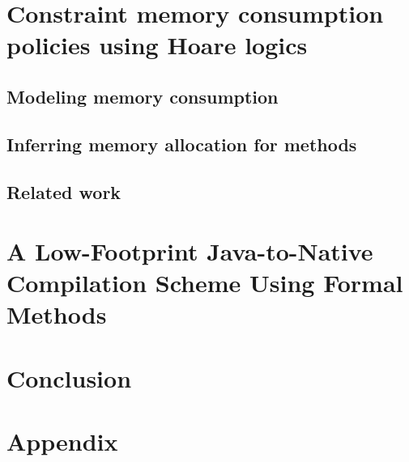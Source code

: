 \documentclass[book,10pt]{book}
\begin{document}
 
\chapter{Constraint memory consumption policies using Hoare logics}\label{applications:memory}
  
  \lstset{numbers=none}

  \section{Modeling memory consumption}\label{sec:verif}
    
  
  
  
  \section{Inferring memory allocation for methods}\label{sec:infer}
  \label{sec:infer}
  \section{Related work}\label{sec:rel}
  

\chapter{A Low-Footprint Java-to-Native Compilation Scheme Using Formal Methods}\label{applications:optimComp}
  \lstset{frameround=tttt}
  
  
  
  
  
  
   
   
  
 

\chapter{Conclusion}


\appendix
\chapter{Appendix}

    
    

 
 


\end{document}

